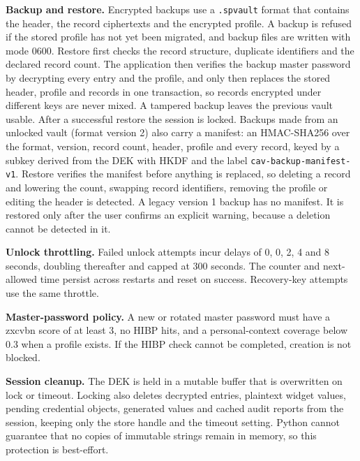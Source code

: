 \documentclass[preprint,12pt]{elsarticle}
\begin{document}
\textbf{Backup and restore.} Encrypted backups use a \texttt{.spvault} format that contains the header, the record ciphertexts and the encrypted profile. A backup is refused if the stored profile has not yet been migrated, and backup files are written with mode 0600. Restore first checks the record structure, duplicate identifiers and the declared record count. The application then verifies the backup master password by decrypting every entry and the profile, and only then replaces the stored header, profile and records in one transaction, so records encrypted under different keys are never mixed. A tampered backup leaves the previous vault usable. After a successful restore the session is locked. Backups made from an unlocked vault (format version 2) also carry a manifest: an HMAC-SHA256 over the format, version, record count, header, profile and every record, keyed by a subkey derived from the DEK with HKDF and the label \texttt{cav-backup-manifest-v1}. Restore verifies the manifest before anything is replaced, so deleting a record and lowering the count, swapping record identifiers, removing the profile or editing the header is detected. A legacy version 1 backup has no manifest. It is restored only after the user confirms an explicit warning, because a deletion cannot be detected in it.

\textbf{Unlock throttling.} Failed unlock attempts incur delays of 0, 0, 2, 4 and 8 seconds, doubling thereafter and capped at 300 seconds. The counter and next-allowed time persist across restarts and reset on success. Recovery-key attempts use the same throttle.

\textbf{Master-password policy.} A new or rotated master password must have a zxcvbn score of at least 3, no HIBP hits, and a personal-context coverage below 0.3 when a profile exists. If the HIBP check cannot be completed, creation is not blocked.

\textbf{Session cleanup.} The DEK is held in a mutable buffer that is overwritten on lock or timeout. Locking also deletes decrypted entries, plaintext widget values, pending credential objects, generated values and cached audit reports from the session, keeping only the store handle and the timeout setting. Python cannot guarantee that no copies of immutable strings remain in memory, so this protection is best-effort.
\end{document}
